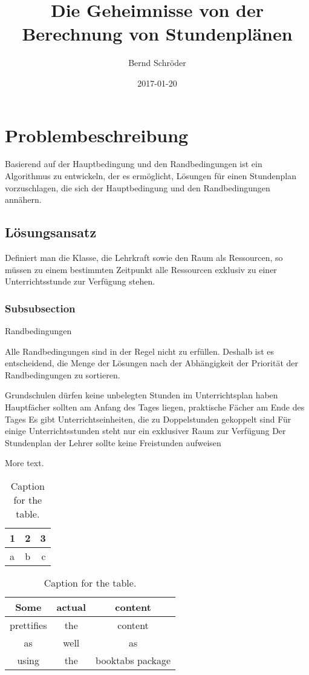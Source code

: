 \documentclass{article}
\title{Die Geheimnisse von der Berechnung von Stundenplänen}
\date{2017-01-20}
\author{Bernd Schröder}
\begin{document}
\maketitle
\newpage
{}

\section{Problembeschreibung}
Basierend auf der Hauptbedingung und den Randbedingungen ist ein Algorithmus zu entwickeln, der es ermöglicht, Lösungen für einen Stundenplan vorzuschlagen, die sich der Hauptbedingung und den Randbedingungen annähern.

\subsection{Lösungsansatz}
Definiert man die Klasse, die Lehrkraft sowie den Raum als Ressourcen, so müssen zu einem bestimmten Zeitpunkt alle Ressourcen exklusiv zu einer Unterrichtsstunde zur Verfügung stehen.



\subsubsection{Subsubsection}
Randbedingungen

Alle Randbedingungen sind in der Regel nicht zu erfüllen. Deshalb ist es entscheidend, die Menge der Lösungen nach der Abhängigkeit der Priorität der Randbedingungen zu sortieren.

    Grundschulen dürfen keine unbelegten Stunden im Unterrichtsplan haben
    Hauptfächer sollten am Anfang des Tages liegen, praktische Fächer am Ende des Tages
    Es gibt Unterrichtseinheiten, die zu Doppelstunden gekoppelt sind
    Für einige Unterrichtsstunden steht nur ein exklusiver Raum zur Verfügung
    Der Stundenplan der Lehrer sollte keine Freistunden aufweisen


More text.

\begin{table}[h!]
  \centering
  \caption{Caption for the table.}
  \label{tab:table1}
  \begin{tabular}{l|c||r}
    1 & 2 & 3\\
    \hline
    a & b & c\\
  \end{tabular}
\end{table}

\begin{table}[h!]
  \centering
  \caption{Caption for the table.}
  \label{tab:table1}
  \begin{tabular}{ccc}
    \toprule
    Some & actual & content\\
    \midrule
    prettifies & the & content\\
    as & well & as\\
    using & the & booktabs package\\
    \bottomrule
  \end{tabular}
\end{table}
\end{document}
